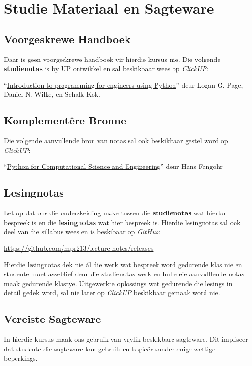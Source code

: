 \section{Studie Materiaal en Sagteware}
    \subsection{Voorgeskrewe Handboek}
        Daar is geen voorgeskrewe handboek vir hierdie kursus nie. Die volgende
        \textbf{studienotas} is by UP ontwikkel en sal beskikbaar wees op
        \textit{ClickUP}:

        ``\underline{Introduction to programming for engineers using Python}''
        deur Logan G. Page, Daniel N. Wilke, en Schalk Kok.

    \subsection{Komplement\^{e}re Bronne}
        Die volgende aanvullende bron van notas sal ook beskikbaar gestel word
        op \textit{ClickUP}:

        ``\underline{Python for Computational Science and Engineering}'' deur
        Hans Fangohr

    \subsection{Lesingnotas}
        Let op dat ons die onderskeiding make tussen die \textbf{studienotas}
        wat hierbo bespreek is en die \textbf{lesingnotas} wat hier bespreek
        is. Hierdie lesingnotas sal ook deel van die sillabus wees en is
        beskibaar op \textit{GitHub}:

        \url{https://github.com/mpr213/lecture-notes/releases}

        Hierdie lesingnotas dek nie \'{a}l die werk wat bespreek word gedurende
        klas nie en studente moet asseblief deur die studienotas werk en hulle
        eie aanvulllende notas maak gedurende klastye. Uitgewerkte oplossings
        wat gedurende die lesings in detail gedek word, sal nie later op
        \textit{ClickUP} beskikbaar gemaak word nie.

    \subsection{Vereiste Sagteware}
        In hierdie kursus maak ons gebruik van vrylik-beskikbare sagteware.
        Dit impliseer dat studente die sagteware kan gebruik en kopie\"er
        sonder enige wettige beperkings.

